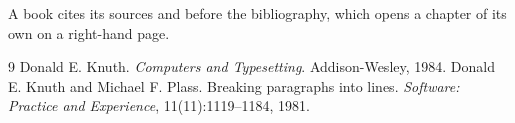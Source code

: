 \documentclass{book}
\begin{document}
A book cites its sources \cite{knuth84} and \cite{plass81} before the
bibliography, which opens a chapter of its own on a right-hand page.

\begin{thebibliography}{9}
 Donald E. Knuth. \emph{Computers and Typesetting}. Addison-Wesley, 1984.
 Donald E. Knuth and Michael F. Plass. Breaking paragraphs
  into lines. \emph{Software: Practice and Experience}, 11(11):1119--1184, 1981.
\end{thebibliography}
\end{document}
